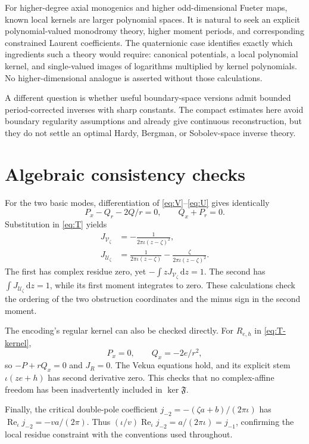 \documentclass[11pt,a4paper]{article}
\numberwithin{equation}{section}
\theoremstyle{definition}
\theoremstyle{remark}
\newcommand{\Fu}{\mathfrak F}
\newcommand{\ReC}{\operatorname{Re}_{\iota}}
\newcommand{\dd}{\,\mathrm d}
\newcommand{\Uker}{\mathcal U}
\newcommand{\Vker}{\mathcal V}
\begin{document}
For higher-degree axial monogenics and higher odd-dimensional Fueter
maps, known local kernels are larger polynomial spaces. It is natural
to seek an explicit polynomial-valued monodromy theory, higher moment
periods, and corresponding constrained Laurent coefficients. The
quaternionic case identifies exactly which ingredients such a theory
would require: canonical potentials, a local polynomial kernel, and
single-valued images of logarithms multiplied by kernel polynomials.
No higher-dimensional analogue is asserted without those calculations.

A different question is whether useful boundary-space versions admit
bounded period-corrected inverses with sharp constants. The compact
estimates here avoid boundary regularity assumptions and already give
continuous reconstruction, but they do not settle an optimal Hardy,
Bergman, or Sobolev-space inverse theory.

\appendix
\section{Algebraic consistency checks}
\label{sec:checks}

For the two basic modes, differentiation of
\eqref{eq:V}--\eqref{eq:U} gives identically
\[
 P_x-Q_r-2Q/r=0,\qquad Q_x+P_r=0.
\]
Substitution in \eqref{eq:T} yields
\begin{align*}
 J_{\Vker_\zeta}&=-\frac1{2\pi\iota(z-\zeta)^2},\\
 J_{\Uker_\zeta}&=\frac1{2\pi\iota(z-\zeta)}
                    -\frac\zeta{2\pi\iota(z-\zeta)^2}.
\end{align*}
The first has complex residue zero, yet
$-\int zJ_{\Vker_\zeta}\dd z=1$. The second has
$\int J_{\Uker_\zeta}\dd z=1$, while its first moment integrates to
zero. These calculations check the ordering of the two obstruction
coordinates and the minus sign in the second moment.

The encoding's regular kernel can also be checked directly. For
$R_{e,h}$ in \eqref{eq:T-kernel},
\[
 P_x=0,\qquad Q_x=-2e/r^2,
\]
so $-P+rQ_x=0$ and $J_R=0$. The Vekua equations hold, and its explicit
stem $\iota(ze+h)$ has second derivative zero. This checks that no
complex-affine freedom has been inadvertently included in $\ker\Fu$.

Finally, the critical double-pole coefficient
$j_{-2}=-(\zeta a+b)/(2\pi\iota)$ has
$\ReC j_{-2}=-va/(2\pi)$. Thus
$(\iota/v)\ReC j_{-2}=a/(2\pi\iota)=j_{-1}$, confirming the local
residue constraint with the conventions used throughout.
\end{document}
